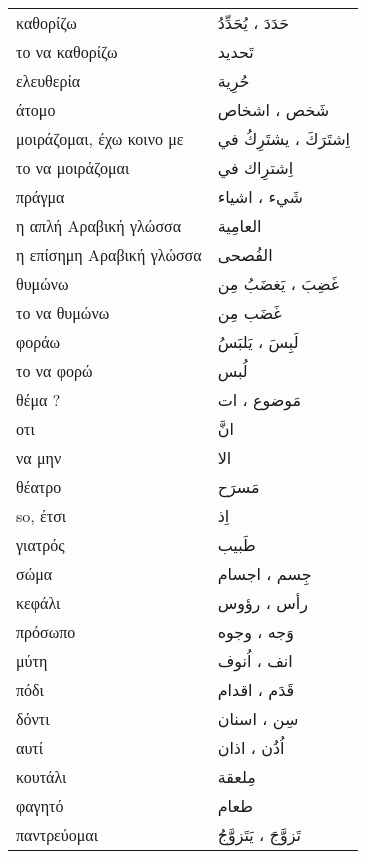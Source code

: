 \documentclass[twocolumn,a4paper]{article}
\newcommand{\ar}[1]{\textarabic{#1}}
\newcommand{\pl}{\raisebox{0.15ex}{\footnotesize ◍}}
\newcommand{\normpl}[1]{\ar{ #1، ات }}
\newcommand{\vrf}{\raisebox{0.15ex}{\footnotesize ◉}}
\newcommand{\mas}{\raisebox{0.15ex}{\footnotesize ◫}}
\begin{document}
\begin{mpsupertabular}{ P{0.5\textwidth} P{0.5\textwidth} }
καθορίζω \vrf                & \ar{ حَدَدَ ، يُحَدِّدُ } \\
το να καθορίζω \mas          & \ar{ تَحديد } \\
ελευθερία                    & \ar{ حُرِية } \\
άτομο \pl                    & \ar{ شَخص ، اشخاص } \\
μοιράζομαι, έχω κοινο με \vrf & \ar{ اِشتَرَكَ ، يشتَرِكُ في } \\
το να μοιράζομαι \mas        & \ar{ اِشترِاك في } \\
πράγμα \pl                   & \ar{ شَيء ، اشياء } \\
η απλή Αραβική γλώσσα        & \ar{ العامِية } \\
η επίσημη Αραβική γλώσσα     & \ar{ الفُصحى } \\
θυμώνω \vrf                  & \ar{ غَضِبَ ، يَغضَبُ مِن }  \\
το να θυμώνω \mas            & \ar{ غَضَب مِن } \\
φοράω \vrf                   & \ar{ لَبِسَ ، يَلبَسُ } \\
το να φορώ \mas              & \ar{ لُبس } \\
θέμα ?                       & \normpl{ مَوضوع } \\
οτι                          & \ar{ انَّ } \\
να μην                       & \ar{ الا } \\
θέατρο                       & \ar{ مَسرَح } \\
so, έτσι                     & \ar{ اِذ } \\
γιατρός                      & \ar{ طَبيب } \\
σώμα \pl                     & \ar{ جِسم ، اجسام } \\
κεφάλι \pl                   & \ar{ رأس ، رؤوس } \\
πρόσωπο \pl                  & \ar{ وَجه ، وجوه } \\
μύτη \pl                     & \ar{ انف ، اُنوف } \\
πόδι \pl                     & \ar{ قَدَم ، اقدام } \\
δόντι \pl                    & \ar{ سِن ، اسنان } \\
αυτί \pl                     & \ar{ اُذُن ، اذان } \\
κουτάλι                      & \ar{ مِلعقة } \\
φαγητό                       & \ar{ طعام } \\
παντρεύομαι \vrf             & \ar{ تَزوَّجَ ، يَتَزوَّجُ } \\

\end{mpsupertabular}
\end{document}
